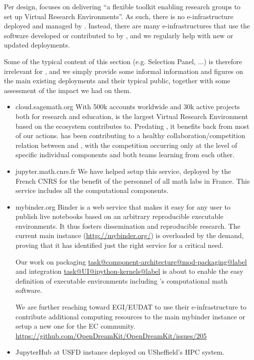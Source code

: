 \documentclass{deliverablereport}
\makeatletter
\newcommand\localtaskref[2]{\hyperref[#1@#2]{\csname task@#1@#2@label\endcsname}}
\makeatother
\begin{document}
\label{infrastructures}

Per design, \ODK focuses on delivering ``a flexible toolkit enabling
research groups to set up Virtual Research Environments''. As such,
there is no e-infrastructure deployed and managed by \ODK. Instead,
there are many e-infrastructures that use the software developed or
contributed to by \ODK, and we regularly help with new or updated
deployments.

Some of the typical content of this section (e.g. Selection Panel,
...) is therefore irrelevant for \ODK, and we simply provide some
informal information and figures on the main existing deployments and
their typical public, together with some assessment of the impact we
had on them.

\begin{itemize}
\item{cloud.sagemath.org} With 500k accounts worldwide and 30k active
  projects both for research and education, \SMC is the largest
  Virtual Research Environment based on the ecosystem \ODK contributes
  to. Predating \ODK, it benefits back from most of our actions. \ODK
  has been contributing to a healthy collaboration/competition
  relation between \JupyterHub and \SMC, with the competition
  occurring only at the level of specific individual components and
  both teams learning from each other.

\item{jupyter.math.cnrs.fr} We have helped setup this \JupyterHub
  service, deployed by the French CNRS for the benefit of the
  personnel of all math labs in France. This service includes all the
  \ODK computational components.

\item{mybinder.org} Binder is a web service that makes it easy for any
  user to publish live notebooks based on an arbitrary reproducible
  executable environments. It thus fosters dissemination and
  reproducible research. The current main instance
  (\url{http://mybinder.org/}) is overloaded by the demand, proving
  that it has identified just the right service for a critical need.

  Our work on packaging
  \localtaskref{component-architecture}{mod-packaging} and \Jupyter
  integration \localtaskref{UI}{ipython-kernels} is about to enable
  the easy definition of executable environments including \ODK's
  computational math software.

  We are further reaching toward EGI/EUDAT to use their
  e-infrastructure to contribute additional computing resources to the
  main mybinder instance or setup a new one for the EC community.
  \url{https://github.com/OpenDreamKit/OpenDreamKit/issues/205}

\item{JupyterHub at USFD}
  \href{http://docs.iceberg.shef.ac.uk/en/latest/using-iceberg/accessing/jupyterhub.html}{\JupyterHub}
  instance deployed on USheffield's HPC system.
\end{itemize}
\end{document}
